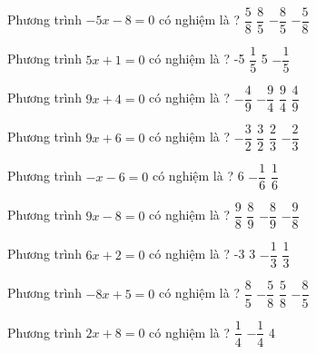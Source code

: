 \begin{ex} 
	Phương trình $-5x-8=0$ có nghiệm là ? 
	\choice
	{$ \dfrac{ 5 }{ 8 } $}
	{$ \dfrac{ 8 }{ 5 } $}
	{\True $- \dfrac{ 8 }{ 5 } $}
	{$- \dfrac{ 5 }{ 8 } $}
	\loigiai{} 
\end{ex}

\begin{ex} 
	Phương trình $5x+1=0$ có nghiệm là ? 
	\choice
	{-5}
	{$ \dfrac{ 1 }{ 5 } $}
	{5}
	{\True $- \dfrac{ 1 }{ 5 } $}
	\loigiai{} 
\end{ex}

\begin{ex} 
	Phương trình $9x+4=0$ có nghiệm là ? 
	\choice
	{\True $- \dfrac{ 4 }{ 9 } $}
	{$- \dfrac{ 9 }{ 4 } $}
	{$ \dfrac{ 9 }{ 4 } $}
	{$ \dfrac{ 4 }{ 9 } $}
	\loigiai{} 
\end{ex}

\begin{ex} 
	Phương trình $9x+6=0$ có nghiệm là ? 
	\choice
	{$- \dfrac{ 3 }{ 2 } $}
	{$ \dfrac{ 3 }{ 2 } $}
	{$ \dfrac{ 2 }{ 3 } $}
	{\True $- \dfrac{ 2 }{ 3 } $}
	\loigiai{} 
\end{ex}

\begin{ex} 
	Phương trình $-x-6=0$ có nghiệm là ? 
	\choice
	{6}
	{}
	{$- \dfrac{ 1 }{ 6 } $}
	{$ \dfrac{ 1 }{ 6 } $}
	\loigiai{} 
\end{ex}

\begin{ex} 
	Phương trình $9x-8=0$ có nghiệm là ? 
	\choice
	{$ \dfrac{ 9 }{ 8 } $}
	{\True $ \dfrac{ 8 }{ 9 } $}
	{$- \dfrac{ 8 }{ 9 } $}
	{$- \dfrac{ 9 }{ 8 } $}
	\loigiai{} 
\end{ex}

\begin{ex} 
	Phương trình $6x+2=0$ có nghiệm là ? 
	\choice
	{-3}
	{3}
	{\True $- \dfrac{ 1 }{ 3 } $}
	{$ \dfrac{ 1 }{ 3 } $}
	\loigiai{} 
\end{ex}

\begin{ex} 
	Phương trình $-8x+5=0$ có nghiệm là ? 
	\choice
	{$ \dfrac{ 8 }{ 5 } $}
	{$- \dfrac{ 5 }{ 8 } $}
	{\True $ \dfrac{ 5 }{ 8 } $}
	{$- \dfrac{ 8 }{ 5 } $}
	\loigiai{} 
\end{ex}

\begin{ex} 
	Phương trình $2x+8=0$ có nghiệm là ? 
	\choice
	{$ \dfrac{ 1 }{ 4 } $}
	{}
	{$- \dfrac{ 1 }{ 4 } $}
	{4}
	\loigiai{} 
\end{ex}

